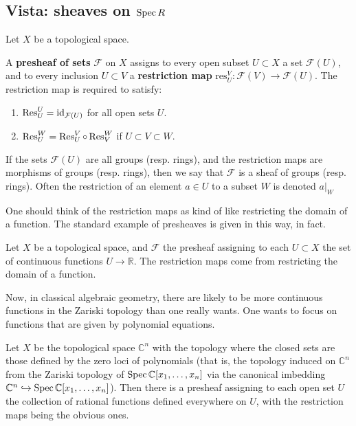 \subsection{Vista: sheaves on $\operatorname{Spec} R$}

Let $X$ be a topological space. 
\begin{definition} 
A \textbf{presheaf of sets} $\mathcal{F}$ on $X$ assigns to
every open subset
$U \subset X$ a set $\mathcal{F} (U)$, and to every inclusion $U
\subset V$ a
\textbf{restriction map}
$\mathrm{res}^V_U : \mathcal{F}(V) \to \mathcal{F}(U)$. The
restriction map is
required to satisfy:
\begin{enumerate}
\item $\operatorname{Res}^U_U = \operatorname{id}_{\mathcal{F}(U)} $ for all open sets $U$.
\item $\operatorname{Res}^W_U = \operatorname{Res}^V_U \circ \operatorname{Res}^W_V $ if $U \subset V
\subset W$.
\end{enumerate}

If the sets $\mathcal{F}(U)$ are all groups (resp. rings), and
the restriction
maps are morphisms of groups (resp. rings), then we say that
$\mathcal{F}$ is a
sheaf of groups (resp. rings). Often the restriction of an
element $a\in U$ to a subset $W$ is denoted $a|_W$
\end{definition} 


One should think of the restriction maps as kind of like
restricting the
domain of a function.
The standard example of presheaves is given in this way, in
fact.
\begin{example} 
Let $X$ be a topological space, and $\mathcal{F}$ the presheaf
assigning to
each $U \subset X$ the set of continuous functions $U \to
\mathbb{R}$. The
restriction maps come from restricting the domain of a function.\end{example} 

Now, in classical algebraic geometry, there are likely to be
more
continuous functions in the Zariski topology than one really
wants. One wants
to focus on functions that are given by polynomial equations.

\begin{example} 
Let $X$ be the topological space $\mathbb{C}^n$ with the
topology where the
closed sets are those defined by the zero loci of polynomials
(that is, the
topology induced on $\mathbb{C}^n$ from the Zariski topology of
$\operatorname{Spec}
\mathbb{C}[x_1, \dots, x_n]$ via the canonical imbedding
$\mathbb{C}^n
\hookrightarrow \operatorname{Spec} \mathbb{C}[x_1, \dots, x_n]$). Then there
is a presheaf
assigning to each open set $U$ the collection of rational
functions defined
everywhere on $U$, with the restriction maps being the obvious
ones.
\end{example} 

